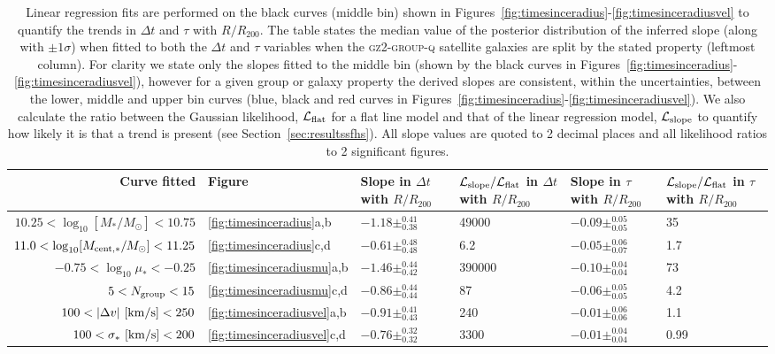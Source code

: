 \documentclass[useAMS,usenatbib]{mn2e}
\def\minor		{\color{minorcol}}
\begin{document}
\begin{table}

\centering
\caption{Linear regression fits are performed on the black curves (middle bin) shown in Figures~\ref{fig:timesinceradius}-\ref{fig:timesinceradiusvel} to quantify the trends in $\Delta t$ and $\tau$ with $R/R_{200}$. The table states the median value of the posterior distribution of the inferred slope (along with $\pm1\sigma$) when fitted to both the $\Delta t$ and $\tau$ variables when the \textsc{gz2-group-q} satellite galaxies are split by the stated property (leftmost column). For clarity we state only the slopes fitted to the middle bin (shown by the black curves in Figures~\ref{fig:timesinceradius}-\ref{fig:timesinceradiusvel}), however for a given group or galaxy property the derived slopes are consistent, within the uncertainties, between the lower, middle and upper bin curves (blue, black and red curves in Figures~\ref{fig:timesinceradius}-\ref{fig:timesinceradiusvel}). {\minor We also calculate the ratio between the Gaussian likelihood, $\mathcal{L}_{\rm{flat}}$ for a flat line model and that of the linear regression model, $\mathcal{L}_{\rm{slope}}$ to quantify how likely it is that a trend is present (see Section~\ref{sec:resultssfhs}).  All slope values are quoted to 2 decimal places and all likelihood ratios to 2 significant figures.}}
\label{table:resultsum}
%
%
%
\setlength\extrarowheight{3pt}
\begin{tabularx}{\textwidth}{r|C|C|C|C|C}

\hline
Curve fitted & Figure & Slope in $\Delta t$ with $R/R_{200}$  & $\mathcal{L}_{\rm{slope}}/\mathcal{L}_{\rm{flat}}$ in  $\Delta t$ with $R/R_{200}$   & Slope in $\tau$ with $R/R_{200}$  & $\mathcal{L}_{\rm{slope}}/\mathcal{L}_{\rm{flat}}$ in $\tau$ with $R/R_{200}$       \\ \hline 
$10.25 < \log_{10}[M_*/M_{\odot}] < 10.75$                 & \ref{fig:timesinceradius}a,b           & $-1.18\pm_{0.38}^{0.41}$ & 49000 & $-0.09\pm_{0.05}^{0.05}$ & 35 \\
$11.0 < \log_{10}[M_{\rm{cent},*}/M_{\odot}] < 11.25$     & \ref{fig:timesinceradius}c,d           & $-0.61\pm_{0.48}^{0.48}$ & 6.2 & $-0.05\pm_{0.07}^{0.06}$ & 1.7 \\
$-0.75 < \log_{10}\mu_* < -0.25$               & \ref{fig:timesinceradiusmu}a,b         & $-1.46\pm_{0.42}^{0.44}$ & 390000 & $-0.10\pm_{0.04}^{0.04}$ & 73 \\
$5 < N_{\rm{group}}< 15$      & \ref{fig:timesinceradiusmu}c,d         & $-0.86\pm_{0.44}^{0.44}$ & 87 & $-0.06\pm_{0.05}^{0.05}$ & 4.2 \\
$100 < |\Delta v|~[\rm{km/s}] < 250$          & \ref{fig:timesinceradiusvel}a,b        & $-0.91\pm_{0.43}^{0.41}$ & 240& $-0.01\pm_{0.06}^{0.06}$ & 1.1 \\
$100 < \sigma_*~[\rm{km/s}] < 200$            & \ref{fig:timesinceradiusvel}c,d        & $-0.76\pm_{0.32}^{0.32}$ & 3300 & $-0.01\pm_{0.04}^{0.04}$ & 0.99 \\ \hline
\end{tabularx}
\end{table}
\end{document}
